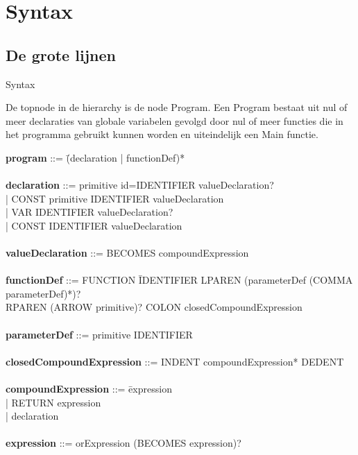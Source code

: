 \chapter{Syntax}
\section{De grote lijnen}
Syntax

De topnode in de hierarchy is de node Program. Een Program bestaat uit nul of meer declaraties van globale variabelen gevolgd door nul of meer functies die in het programma gebruikt kunnen worden en uiteindelijk een Main functie.

\begin{tabbing}

{\bf program}                     ::= \=(declaration | functionDef)*\\
\\
{\bf declaration}                 ::= primitive id=IDENTIFIER valueDeclaration?\\
                                      \> | CONST primitive IDENTIFIER valueDeclaration\\
                                      \> | VAR IDENTIFIER valueDeclaration?\\
                                      \> | CONST IDENTIFIER valueDeclaration\\
\\
{\bf valueDeclaration}            ::= BECOMES compoundExpression\\
\\
{\bf functionDef}                 ::= FUNCTION \=IDENTIFIER LPAREN (parameterDef (COMMA parameterDef)*)?\\
                                      \>RPAREN (ARROW primitive)? COLON closedCompoundExpression\\
\\
{\bf parameterDef}                ::= primitive IDENTIFIER \\
\\
{\bf closedCompoundExpression}    ::= INDENT compoundExpression* DEDENT\\
\\ 
{\bf compoundExpression}          ::= \=expression\\
                                      \> | RETURN expression\\
                                      \> | declaration\\
\\ 
{\bf expression}                  ::= orExpression (BECOMES expression)?\\

\end{tabbing}
